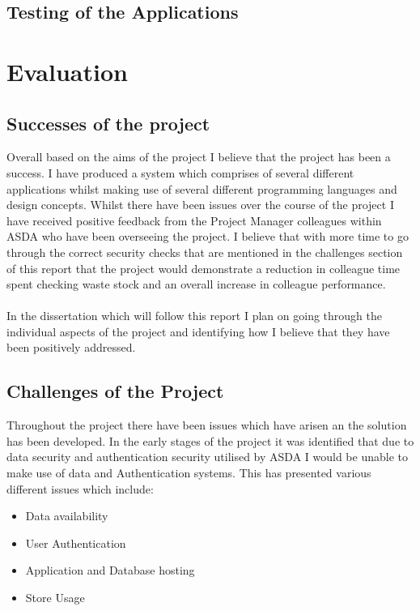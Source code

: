 \documentclass[a4paper,11pt]{report}
\begin{document}
\section{Testing of the Applications}

\chapter{Evaluation}
\section {Successes of the project}
Overall based on the aims of the project I believe that the project has been a success. I have produced a system which comprises of several different applications whilst making use of several different programming languages and design concepts. 
 Whilst there have been issues over the course of the project I have received positive feedback from the Project Manager colleagues within ASDA who have been overseeing the project.
I believe that with more time to go through the correct security checks that are mentioned in the challenges section of this report that the project would demonstrate a reduction in 
colleague time spent checking waste stock and an overall increase in colleague performance. 
\\
\\
In the dissertation which will follow this report I plan on going through the individual aspects of the project and identifying how I believe that they have been positively addressed.

\section {Challenges of the Project}
Throughout the project there have been issues which have arisen an the solution has been developed. In the early stages of the project it was identified that due to data security and authentication security utilised by ASDA I would be unable to make use of data and Authentication systems. This has presented various different issues which include:
\begin{itemize}
    \item Data availability
    \item User Authentication
    \item Application and Database hosting
    \item Store Usage
\end{itemize}
\end{document}
